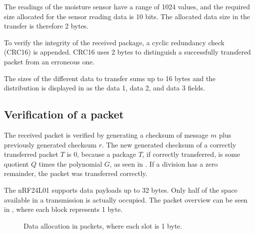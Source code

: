 The readings of the moisture sensor have a range of 1024 values, and the required size allocated for the sensor reading data is 10 bits. The allocated data size in the transfer is therefore 2 bytes.

To verify the integrity of the received package, a cyclic redundancy check (CRC16) is appended. CRC16 uses 2 bytes to distinguish a successfully transfered packet from an erroneous one.

The sizes of the different data to transfer sums up to 16 bytes and the distribution is displayed in  as the data 1, data 2, and data 3 fields.

\subsection{Verification of a packet}
The received packet is verified by generating a checksum of message $m$ plus previously generated checksum $r$.
The new generated checksum of a correctly transferred packet $T$ is 0, because a package $T$, if correctly transferred, is some quotient $Q$ times the polynomial $G$, as seen in . If a division has a zero remainder, the packet was transferred correctly.

The nRF24L01 supports data payloads up to 32 bytes. Only half of the space available in a transmission is actually occupied. The packet overview can be seen in , where each block represents 1 byte.
\begin{figure}[h!]
	\centering
	\caption{Data allocation in packets, where each slot is 1 byte.}
	\label{fig:dataalloc}
\end{figure}

